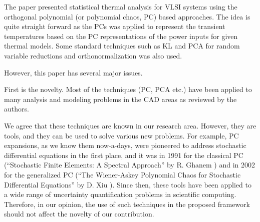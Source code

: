 \begin{reviewer}
The paper presented statistical thermal analysis for VLSI systems using the orthogonal polynomial  (or polynomial chaos, PC) based approaches. The idea is quite straight forward as the PCs was applied to represent the transient temperatures based on the PC representations of the power inputs for given thermal models. Some standard techniques such as KL and PCA for random variable reductions and orthonormalization was also used.

However, this paper has several major issues.

\vspace{0.5em}
\noindent[Comment 1] First is the novelty. Most of the techniques (PC, PCA etc.) have been applied to many analysis and modeling problems in the CAD areas as reviewed by the authors.
\end{reviewer}
\begin{authors}
We agree that these techniques are known in our research area.
However, they are tools, and they can be used to solve various new problems.
For example, PC expansions, as we know them now-a-days, were pioneered to address stochastic differential equations in the first place, and it was in 1991 for the classical PC (``Stochastic Finite Elements: A Spectral Approach'' by R. Ghanem \etal) and in 2002 for the generalized PC (``The Wiener-Askey Polynomial Chaos for Stochastic Differential Equations'' by D. Xiu \etal).
Since then, these tools have been applied to a wide range of uncertainty quantification problems in scientific computing.
Therefore, in our opinion, the use of such techniques in the proposed framework should not affect the novelty of our contribution.
\end{authors}

